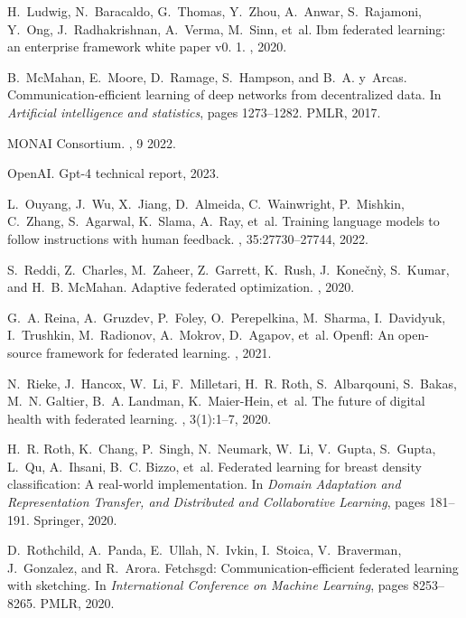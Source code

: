 \documentclass[11pt]{article}
\begin{document}
\begin{thebibliography}{10}
H.~Ludwig, N.~Baracaldo, G.~Thomas, Y.~Zhou, A.~Anwar, S.~Rajamoni, Y.~Ong,
  J.~Radhakrishnan, A.~Verma, M.~Sinn, et~al.
\newblock Ibm federated learning: an enterprise framework white paper v0. 1.
, 2020.

B.~McMahan, E.~Moore, D.~Ramage, S.~Hampson, and B.~A. y~Arcas.
\newblock Communication-efficient learning of deep networks from decentralized
  data.
\newblock In {\em Artificial intelligence and statistics}, pages 1273--1282.
  PMLR, 2017.

{MONAI Consortium}.
, 9 2022.

OpenAI.
\newblock Gpt-4 technical report, 2023.

L.~Ouyang, J.~Wu, X.~Jiang, D.~Almeida, C.~Wainwright, P.~Mishkin, C.~Zhang,
  S.~Agarwal, K.~Slama, A.~Ray, et~al.
\newblock Training language models to follow instructions with human feedback.
,
  35:27730--27744, 2022.

S.~Reddi, Z.~Charles, M.~Zaheer, Z.~Garrett, K.~Rush, J.~Kone{\v{c}}n{\`y},
  S.~Kumar, and H.~B. McMahan.
\newblock Adaptive federated optimization.
, 2020.

G.~A. Reina, A.~Gruzdev, P.~Foley, O.~Perepelkina, M.~Sharma, I.~Davidyuk,
  I.~Trushkin, M.~Radionov, A.~Mokrov, D.~Agapov, et~al.
\newblock Openfl: An open-source framework for federated learning.
, 2021.

N.~Rieke, J.~Hancox, W.~Li, F.~Milletari, H.~R. Roth, S.~Albarqouni, S.~Bakas,
  M.~N. Galtier, B.~A. Landman, K.~Maier-Hein, et~al.
\newblock The future of digital health with federated learning.
, 3(1):1--7, 2020.

H.~R. Roth, K.~Chang, P.~Singh, N.~Neumark, W.~Li, V.~Gupta, S.~Gupta, L.~Qu,
  A.~Ihsani, B.~C. Bizzo, et~al.
\newblock Federated learning for breast density classification: A real-world
  implementation.
\newblock In {\em Domain Adaptation and Representation Transfer, and
  Distributed and Collaborative Learning}, pages 181--191. Springer, 2020.

D.~Rothchild, A.~Panda, E.~Ullah, N.~Ivkin, I.~Stoica, V.~Braverman,
  J.~Gonzalez, and R.~Arora.
\newblock Fetchsgd: Communication-efficient federated learning with sketching.
\newblock In {\em International Conference on Machine Learning}, pages
  8253--8265. PMLR, 2020.


\end{thebibliography}
\end{document}
